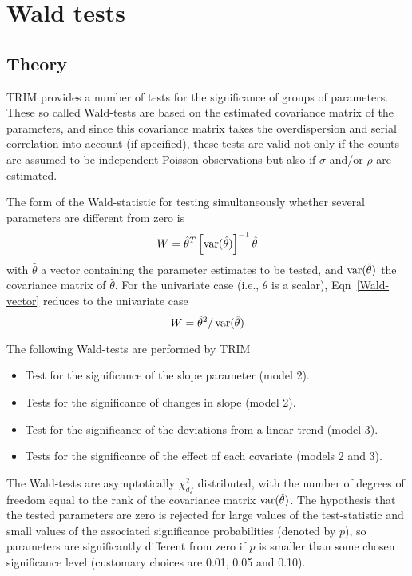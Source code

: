 \documentclass[a4paper]{article}
\begin{document}
\section{Wald tests}\par



\subsection{Theory}\par

TRIM provides a number of tests for the significance of groups of parameters.
These so called Wald-tests are based on the estimated covariance matrix of the parameters,
and since this covariance matrix takes the overdispersion and serial
correlation into account (if specified), these tests are valid not only if
the counts are assumed to be independent Poisson observations but also if
$\sigma$ and/or $\rho$ are estimated.\par

The form of the Wald-statistic for testing simultaneously whether several parameters are different from zero is
\begin{equation}
  W = {\hat\theta}^T \left[\operatorname{var}(\hat\theta)\right]^{-1} \hat\theta
  \label{Wald-vector}
\end{equation}
with $\hat\theta$ a vector containing the parameter estimates to be tested,
and $\operatorname{var}(\hat\theta)$ the covariance matrix of $\hat\theta$.
For the univariate case (i.e., $\theta$ is a scalar),
Eqn~\eqref{Wald-vector} reduces to the univariate case
\begin{equation}
  W = {\hat\theta}^2 / \operatorname{var}(\hat\theta)
  \label{Wald-scalar}
\end{equation}\par

The following Wald-tests are performed by TRIM
\begin{itemize}
\item Test for the significance of the slope parameter (model 2).
\item Tests for the significance of changes in slope (model 2).
\item Test for the significance of the deviations from a linear trend (model 3).
\item Tests for the significance of the effect of each covariate (models 2 and 3).
\end{itemize}
The Wald-tests are asymptotically $\chi^2_{df}$ distributed,
with the number of degrees of freedom equal to the rank of the covariance matrix $\operatorname{var}(\hat\theta)$.
The hypothesis that the tested parameters are zero is rejected for large values of the test-statistic and small values of the associated significance probabilities (denoted by $p$),
so parameters are significantly different from zero if $p$ is smaller than some chosen significance level (customary choices are 0.01, 0.05 and 0.10).\par
\end{document}
